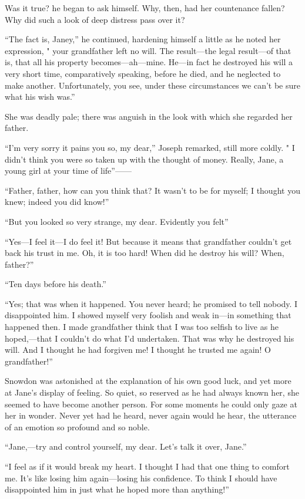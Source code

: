 Was it true? he began to ask himself. Why, then, had her countenance
fallen? Why did such a look of deep distress pass over it?

``The fact is, Janey,'' he continued, hardening himself a little as he
noted her expression, " your grandfather left no will. The result---the
legal result---of that is, that all his property becomes---ah---mine.
He---in fact he destroyed his will a very short time, comparatively
speaking, before he died, and he neglected to make another.
Unfortunately, you see, under these circumstances we can't be sure what
his wish was.''

She was deadly pale; there was anguish in the look with which she
regarded her father.

``I'm very sorry it pains you so, my dear,'' Joseph remarked, still more
coldly. " I didn't think you were so taken up with the thought of money.
Really, Jane, a young girl at your time of life''{{------}}

``Father, father, how can you think that?
{\protect\hypertarget{230}{}{}}It wasn't to be for myself; I thought you
knew; indeed you did know!''

``But you looked so very strange, my dear. Evidently you felt''

``Yes---I feel it---I do feel it! But because it means that grandfather
couldn't get back his trust in me. Oh, it is too hard! When did he
destroy his will? When, father?''

``Ten days before his death.''

``Yes; that was when it happened. You never heard; he promised to tell
nobody. I disappointed him. I showed myself very foolish and weak
in---in something that happened then. I made grandfather think that I
was too selfish to live as he hoped,---that I couldn't do what I'd
undertaken. That was why he destroyed his will. And I thought he had
forgiven me! I thought he trusted me again! O grandfather!''

Snowdon was astonished at the explanation of his own good luck, and yet
more at Jane's display of feeling. So quiet, so reserved as he had
always known her, she seemed to have become another person. For some
moments he could only gaze at her in wonder. Never yet had he heard,
never again would he hear, {\protect\hypertarget{231}{}{}}the utterance
of an emotion so profound and so noble.

``Jane,---try and control yourself, my dear. Let's talk it over, Jane.''

``I feel as if it would break my heart. I thought I had that one thing
to comfort me. It's like losing him again---losing his confidence. To
think I should have disappointed him in just what he hoped more than
anything!''

